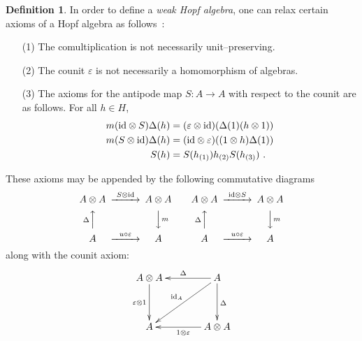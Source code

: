 \documentclass[12pt]{article}
\theoremstyle{plain}
\theoremstyle{definition}
\newtheorem{definition}{Definition}[section]
\numberwithin{equation}{section}
\newcommand{\ID}{{\rm id}}
\newcommand{\vep}{\varepsilon}
\newcommand{\lra}{{\longrightarrow}}
\newcommand{\<}{{\langle}}
\begin{document}
\begin{definition}
In order to define a \emph{weak Hopf algebra}, one can relax certain axioms of a Hopf algebra as follows~:
\begin{itemize}
\item[(1)]
 The comultiplication is not necessarily unit--preserving.
\end{itemize}

\begin{itemize}
\item[(2)]
 The counit $\vep$ is not necessarily a homomorphism of algebras.
\end{itemize}

\begin{itemize}
\item[(3)]
The axioms for the antipode map $S : A \lra A$ with respect to the
counit are as follows. For all $h \in H$,
\begin{equation}
\begin{aligned} m(\ID \otimes S) \Delta (h) &= (\vep \otimes
\ID)(\Delta (1) (h \otimes 1)) \\ m(S \otimes \ID) \Delta (h) &=
(\ID \otimes \vep)((1 \otimes h) \Delta(1)) \\ S(h) &= S(h_{(1)})
h_{(2)}  S(h_{(3)}) ~.
\end{aligned}
\end{equation}
\end{itemize}

 These axioms may be appended by the following commutative diagrams
\begin{equation}
{\begin{CD} A \otimes A @> S\otimes \ID >> A \otimes A
\\ @A \Delta AA   @VV m V
 \\ A @ > u \circ \vep >> A
\end{CD}} \qquad
{\begin{CD} A \otimes A @> \ID\otimes S >> A \otimes A
\\ @A \Delta AA   @VV m V
 \\ A @ > u \circ \vep >> A
\end{CD}}
\end{equation}
along with the counit axiom:
\begin{equation}
\xymatrix@C=3pc@R=3pc{ A \otimes A \ar[d]_{\vep \otimes 1} & A
\ar[l]_{\Delta} \ar[dl]_{\ID_A} \ar[d]^{\Delta}
\\ A  & A \otimes A \ar[l]^{1 \otimes \vep}}
\end{equation}

\end{definition}
\end{document}
